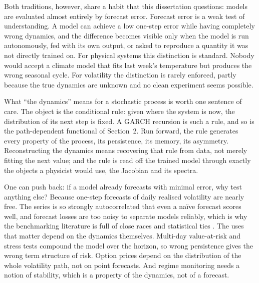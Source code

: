 \documentclass[12pt,a4paper]{article}
\begin{document}
Both traditions, however, share a habit that this dissertation questions:
models are evaluated almost entirely by forecast error. Forecast error is
a weak test of understanding. A model can achieve a low one-step error
while having completely wrong dynamics, and the difference becomes visible
only when the model is run autonomously, fed with its own output, or asked
to reproduce a quantity it was not directly trained on. For physical
systems this distinction is standard. Nobody would accept a climate model
that fits last week's temperature but produces the wrong seasonal cycle.
For volatility the distinction is rarely enforced, partly because the true dynamics are unknown and no clean experiment seems possible.

What ``the dynamics'' means for a stochastic process is worth one
sentence of care. The object is the conditional rule: given where the
system is now, the distribution of its next step is fixed. A GARCH
recursion is such a rule, and so is the path-dependent functional of
Section~2. Run forward, the rule generates every property of the
process, its persistence, its memory, its asymmetry. Reconstructing the
dynamics means recovering that rule from data, not merely fitting the
next value; and the rule is read off the trained model through exactly
the objects a physicist would use, the Jacobian and its spectra.

One can push back: if a model already forecasts with minimal error, why test anything else? Because one-step forecasts of daily realised volatility are nearly free. The series is so strongly autocorrelated that even a na\"ive forecast scores well, and forecast losses are too noisy to separate models reliably, which is why the benchmarking literature is full of close races and statistical ties \citep{grigoryeva2014,li2026,kilic2025}. The uses that matter depend on the dynamics themselves. Multi-day value-at-risk and stress tests compound the model over the horizon, so wrong persistence gives the wrong term structure of risk. Option prices depend on the distribution of the whole volatility path, not on point forecasts. And regime monitoring needs a notion of stability, which is a property of the dynamics, not of a forecast.
\end{document}

